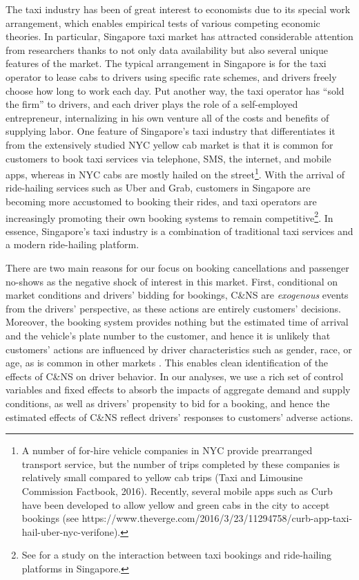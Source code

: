\documentclass[reviewmode]{restud}
\begin{document}
The taxi industry has been of great interest to economists due to its special work arrangement, which enables empirical tests of various competing economic theories. In particular, Singapore taxi market has attracted considerable attention from researchers \citep{Ho3074,chou2002testing,agarwal2015singaporean,agarwal2017anticipated,agarwal2018fickle} thanks to not only data availability but also several unique features of the market. The typical arrangement in Singapore is for the taxi operator to lease cabs to drivers using specific rate schemes, and drivers freely choose how long to work each day. Put another way, the taxi operator has “sold the firm” to drivers, and each driver plays the role of a self-employed entrepreneur, internalizing in his own venture all of the costs and benefits of supplying labor. One feature of Singapore's taxi industry that differentiates it from the extensively studied NYC yellow cab market is that it is common for customers to book taxi services via telephone, SMS, the internet, and mobile apps, whereas in NYC cabs are mostly hailed on the street\footnote{A number of for-hire vehicle companies in NYC provide prearranged transport service, but the number of trips completed by these companies is relatively small compared to yellow cab trips (Taxi and Limousine Commission Factbook, 2016). Recently, several mobile apps such as Curb have been developed to allow yellow and green cabs in the city to accept bookings (see https://www.theverge.com/2016/3/23/11294758/curb-app-taxi-hail-uber-nyc-verifone).}.  With the arrival of ride-hailing services such as Uber and Grab, customers in Singapore are becoming more accustomed to booking their rides, and taxi operators are increasingly promoting their own booking systems to remain competitive\footnote{See \citet{agarwal2018fickle} for a study on the interaction between taxi bookings and ride-hailing platforms in Singapore.}. In essence, Singapore's taxi industry is a combination of traditional taxi services and a modern ride-hailing platform.

There are two main reasons for our focus on booking cancellations and passenger no-shows as the negative shock of interest in this market. First, conditional on market conditions and drivers' bidding for bookings, C\&NS are \textit{exogenous} events from the drivers' perspective, as these actions are entirely customers' decisions. Moreover, the booking system provides nothing but the estimated time of arrival and the vehicle's plate number to the customer, and hence it is unlikely that customers' actions are influenced by driver characteristics such as gender, race, or age, as is common in other markets \citep{mejia2018transparency,cui2016discrimination,edelman2017racial,NBERw22776}. This enables clean identification of the effects of C\&NS on driver behavior. In our analyses, we use a rich set of control variables and fixed effects to absorb the impacts of aggregate demand and supply conditions, as well as drivers' propensity to bid for a booking, and hence the estimated effects of C\&NS reflect drivers' responses to customers' adverse actions.
\end{document}
